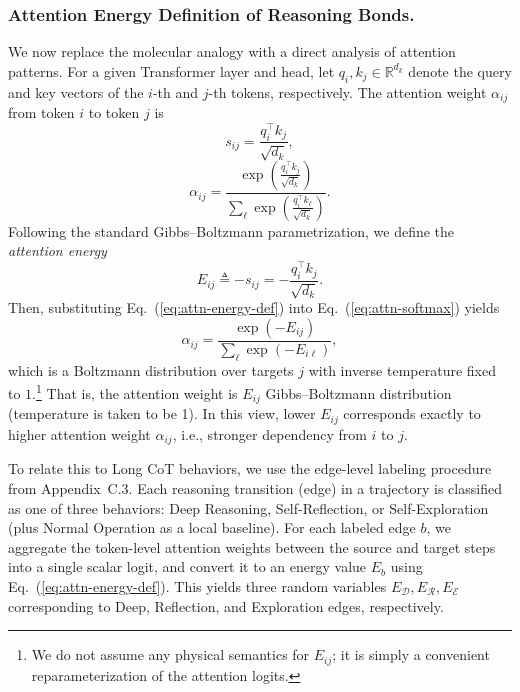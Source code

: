 \subsubsection{Attention Energy Definition of Reasoning Bonds.}
We now replace the molecular analogy with a direct analysis of attention patterns.
For a given Transformer layer and head, let $q_i, k_j \in \mathbb{R}^{d_k}$ denote the query and key vectors of the $i$-th and $j$-th tokens, respectively.
The attention weight $\alpha_{ij}$ from token $i$ to token $j$ is
\begin{equation}
    s_{ij} = \frac{q_i^\top k_j}{\sqrt{d_k}},
\end{equation}
\begin{equation}
\alpha_{ij}
=
\frac{\exp \left(\frac{q_i^\top k_j}{\sqrt{d_k}}\right)}
     {\sum_{\ell}\exp \left(\frac{q_i^\top k_\ell}{\sqrt{d_k}}\right)}.
\label{eq:attn-softmax}
\end{equation}
Following the standard Gibbs–Boltzmann parametrization, we define the \emph{attention energy}
\begin{equation}
E_{ij} \triangleq -s_{ij} = -\frac{q_i^\top k_j}{\sqrt{d_k}}.
\label{eq:attn-energy-def}
\end{equation}
Then, substituting Eq.~(\ref{eq:attn-energy-def}) into Eq.~(\ref{eq:attn-softmax}) yields
\begin{equation}
\alpha_{ij}
=
\frac{\exp(-E_{ij})}{\sum_{\ell}\exp(-E_{i\ell})},
\end{equation}
which is a Boltzmann distribution over targets $j$ with inverse temperature fixed to $1$.\footnote{We do not assume any physical semantics for $E_{ij}$; it is simply a convenient reparameterization of the attention logits.}
That is, the attention weight is $E_{ij}$ Gibbs–Boltzmann distribution (temperature is taken to be 1).
In this view, lower $E_{ij}$ corresponds exactly to higher attention weight $\alpha_{ij}$, i.e., stronger dependency from $i$ to $j$.

To relate this to Long CoT behaviors, we use the edge-level labeling procedure from Appendix~C.3.
Each reasoning transition (edge) in a trajectory is classified as one of three behaviors: Deep Reasoning, Self-Reflection, or Self-Exploration (plus Normal Operation as a local baseline).
For each labeled edge $b$, we aggregate the token-level attention weights between the source and target steps into a single scalar logit, and convert it to an energy value $E_b$ using Eq.~(\ref{eq:attn-energy-def}).
This yields three random variables $E_{\mathcal{D}}, E_{\mathcal{R}}, E_{\mathcal{E}}$ corresponding to Deep, Reflection, and Exploration edges, respectively.

